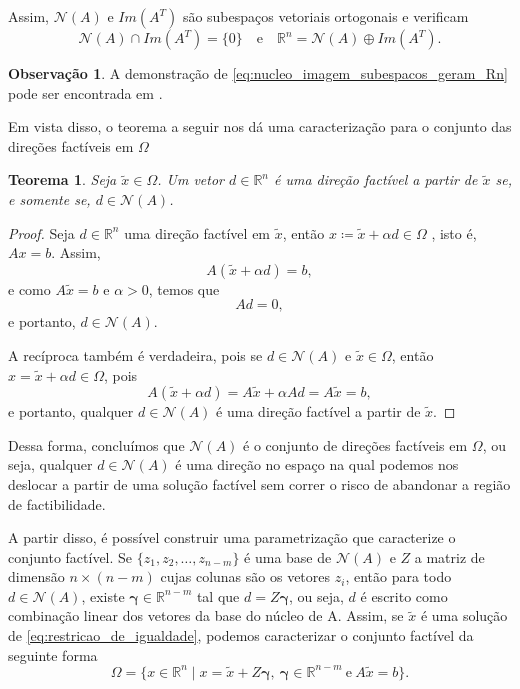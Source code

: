 \documentclass[12pt,a4paper]{scrartcl}
\def\RR{\mathds{R}}
\newtheorem{teo}{Teorema}
\theoremstyle{definition}%
\newtheorem{obs}{Observação}
\begin{document}
Assim, $\mathcal{N}(A)$ e $Im(A^{T})$ são subespaços vetoriais ortogonais e verificam
\[ \label{eq:nucleo_imagem_subespacos_geram_Rn} \mathcal{N}(A) \cap Im(A^{T}) = \{ 0 \} \quad \text{e} \quad \RR^{n} = \mathcal{N}(A) \oplus Im(A^{T}) .\]
\begin{obs} 
A demonstração de \eqref{eq:nucleo_imagem_subespacos_geram_Rn} pode ser encontrada em \textcite{Elon2014}.
\end{obs}

Em vista disso, o teorema a seguir nos dá uma caracterização para o conjunto das direções factíveis em $\Omega$
\begin{teo} \label{teo:direcao_factivel_igualdade}
Seja $\tilde{x} \in \Omega$. Um vetor $d \in \RR^{n}$ é uma direção factível a partir de $\tilde{x}$ se, e somente se, $d \in \mathcal{N}(A)$.
\end{teo}
\begin{proof}
Seja $d \in \RR^{n}$ uma direção factível em $\tilde{x}$, então $x \coloneqq \tilde{x} + \alpha d \in \Omega$ , isto é, $Ax=b$. Assim, 
\[
A(\tilde{x} + \alpha d) = b,
\] 
e como $A\tilde{x} = b$ e $\alpha >0$, temos que 
\[
Ad = 0,
\] 
e portanto, $d \in \mathcal{N}(A)$.

A recíproca também é verdadeira, pois se $d \in \mathcal{N}(A)$ e $\tilde{x} \in \Omega$, então $x= \tilde{x} + \alpha d \in \Omega$, pois
\[
A(\tilde{x} + \alpha d) = A\tilde{x} + \alpha Ad = A\tilde{x} = b ,
\]
e portanto, qualquer $d \in \mathcal{N}(A)$ é uma direção factível a partir de $\tilde{x}$. 
\end{proof}

Dessa forma, concluímos que $\mathcal{N}(A)$ é o conjunto de direções factíveis em $\Omega$, ou seja, qualquer $d \in \mathcal{N}(A)$ é uma direção no espaço na qual podemos nos deslocar a partir de uma solução factível sem correr o risco de abandonar a região de factibilidade.

A partir disso, é possível construir uma parametrização que caracterize o conjunto factível. Se $\{ z_{1}, z_{2}, \ldots , z_{n-m} \}$ é uma base de $\mathcal{N}(A)$ e $Z$ a matriz de dimensão $n\times (n-m)$ cujas colunas são os vetores $z_{i}$, então para todo $d \in \mathcal{N}(A)$, existe $\boldsymbol{\gamma} \in \RR^{n-m}$ tal que $d=Z\boldsymbol{\gamma}$, ou seja, $d$ é escrito como combinação linear dos vetores da base do núcleo de A. Assim, se $\tilde{x}$ é uma solução de \eqref{eq:restricao_de_igualdade}, podemos caracterizar o conjunto factível da seguinte forma
\[ \label{parametrizacao_de_Omega}
\Omega = \{ x \in \RR^{n} \mid x=\tilde{x} + Z\boldsymbol{\gamma} , \ \boldsymbol{\gamma} \in \RR^{n-m} \ \text{e} \ A\tilde{x} =b \} .
\]
\end{document}

